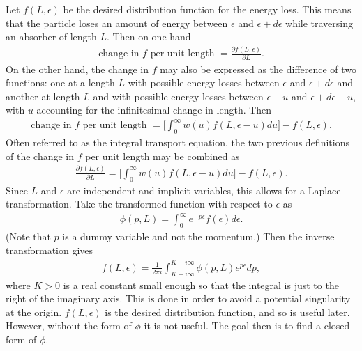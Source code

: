 Let $f(L,\epsilon)$ be the desired distribution function for the energy loss. This means that the particle loses an amount of energy between $\epsilon$ and $\epsilon+d\epsilon$ while traversing an absorber of length $L$. Then on one hand
\begin{align*}
\text{change in $f$ per unit length }=\frac{\partial f(L,\epsilon)}{\partial L}.
\end{align*}
On the other hand, the change in $f$ may also be expressed as the difference of two functions: one at a length $L$ with possible energy losses between $\epsilon$ and $\epsilon+d\epsilon$ and another at length $L$ and with possible energy losses between $\epsilon-u$ and $\epsilon+d\epsilon-u$, with $u$ accounting for the infinitesimal change in length. Then
\begin{align*}
\text{change in $f$ per unit length }=\Bigg [\int_0 ^\infty w(u) f(L,\epsilon-u) du \Bigg] - f(L,\epsilon).
\end{align*}
Often referred to as the integral transport equation, the two previous definitions of the change in $f$ per unit length may be combined as
\begin{align}\label{eqn:Landau1}
\frac{\partial f(L,\epsilon)}{\partial L} = \Bigg [\int_0 ^\infty w(u) f(L,\epsilon-u) du \Bigg] - f(L,\epsilon).
\end{align}
Since $L$ and $\epsilon$ are independent and implicit variables, this allows for a Laplace transformation. Take the transformed function with respect to $\epsilon$ as 
\begin{align*}
\phi(p,L)=\int_0 ^\infty e^{-p \epsilon} f(\epsilon) d\epsilon.
\end{align*}
(Note that $p$ is a dummy variable and not the momentum.)
%
Then the inverse transformation gives
\begin{align} \label{eqn:LandauInverseTransformation}
f(L,\epsilon)=\frac{1}{2\pi i} \int_{K-i \infty} ^{K+i\infty} \phi(p,L) e^{p\epsilon} dp,
\end{align}
where $K>0$ is a real constant small enough so that the integral is just to the right of the imaginary axis. This is done in order to avoid a potential singularity at the origin. $f(L,\epsilon)$ is the desired distribution function, and so is useful later. However, without the form of $\phi$ it is not useful. The goal then is to find a closed form of $\phi$.

